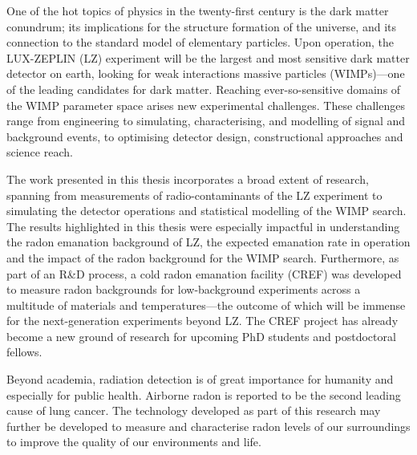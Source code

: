 \begin{impactstatement}

One of the hot topics of physics in the twenty-first century is the dark matter conundrum; its implications for the structure formation of the universe, and its connection to the standard model of elementary particles. Upon operation, the LUX-ZEPLIN (LZ) experiment will be the largest and most sensitive dark matter detector on earth, looking for weak interactions massive particles (WIMPs)—one of the leading candidates for dark matter. Reaching ever-so-sensitive domains of the WIMP parameter space arises new experimental challenges. These challenges range from engineering to simulating, characterising, and modelling of signal and background events, to optimising detector design, constructional approaches and science reach.  

The work presented in this thesis incorporates a broad extent of research, spanning from measurements of radio-contaminants of the LZ experiment to simulating the detector operations and statistical modelling of the WIMP search. The results highlighted in this thesis were especially impactful in understanding the radon emanation background of LZ, the expected emanation rate in operation and the impact of the radon background for the WIMP search. Furthermore, as part of an R&D process, a cold radon emanation facility (CREF) was developed to measure radon backgrounds for low-background experiments across a multitude of materials and temperatures—the outcome of which will be immense for the next-generation experiments beyond LZ. The CREF project has already become a new ground of research for upcoming PhD students and postdoctoral fellows. 

Beyond academia, radiation detection is of great importance for humanity and especially for public health. Airborne radon is reported to be the second leading cause of lung cancer. The technology developed as part of this research may further be developed to measure and characterise radon levels of our surroundings to improve the quality of our environments and life.

\end{impactstatement}


